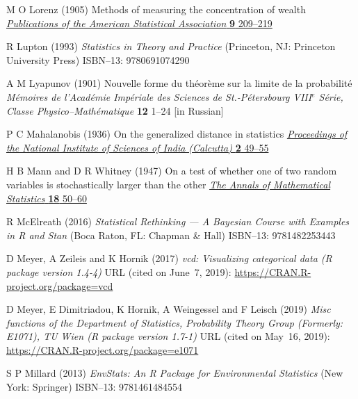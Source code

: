 \begin{thebibliography}{99}
M O Lorenz
(1905) Methods of measuring the concentration of wealth
\href{http://dx.doi.org/10.2307/2276207}{\textit{Publications of the 
American Statistical Association} \textbf{9} 209--219}

R Lupton
(1993) \textit{Statistics in Theory and Practice}
(Princeton, NJ: Princeton University Press)
ISBN--13: 9780691074290

A M Lyapunov
(1901) Nouvelle forme du th\'{e}or\`{e}me sur la limite de la 
probabilit\'{e}
\textit{M\'{e}moires de l'Acad\'{e}mie Imp\'{e}riale des Sciences de 
St.-P\'{e}tersbourg VIII$^{e}$ S\'{e}rie, Classe 
Physico--Math\'{e}matique} \textbf{12} 1--24 [in Russian]

P C Mahalanobis
(1936) On the generalized distance in statistics
\href{http://www.new.dli.ernet.in/rawdataupload/upload/insa/INSA_1/20006193_49.pdf}{\textit{Proceedings of the National Institute of 
Sciences of India (Calcutta)} \textbf{2} 49--55}

H B Mann and D R Whitney
(1947) On a test of whether one of two random variables
is stochastically larger than the other
\href{http://projecteuclid.org/euclid.aoms/1177730491}{\textit{The 
Annals of Mathematical Statistics} \textbf{18} 50--60}

R McElreath
(2016) \textit{Statistical Rethinking --- A Bayesian Course with 
Examples in R and Stan}
(Boca Raton, FL: Chapman \& Hall) ISBN--13: 9781482253443

D Meyer, A Zeileis and K Hornik
(2017) \textit{vcd: Visualizing categorical data
(R package version 1.4-4)}
URL (cited on June~7, 2019): 
\href{https://CRAN.R-project.org/package=vcd}{https://CRAN.R-project.org/package=vcd}

D Meyer, E Dimitriadou, K Hornik, A Weingessel and F Leisch
(2019) \textit{Misc functions of the Department of Statistics,
Probability Theory Group (Formerly: E1071), TU Wien
(R package version 1.7-1)}
URL (cited on May~16, 2019):
\href{https://CRAN.R-project.org/package=e1071}{https://CRAN.R-project.org/package=e1071}

S P Millard
(2013) \textit{EnvStats: An R Package for Environmental Statistics}
(New York: Springer)
ISBN--13: 9781461484554


\end{thebibliography}
